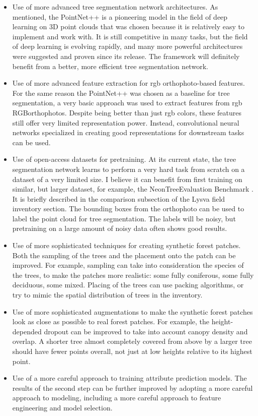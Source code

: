 \begin{itemize}
\item Use of more advanced tree segmentation network architectures.
  As mentioned, the PointNet++ is a pioneering model in the field of deep learning on 3D point clouds that was chosen because it is relatively easy to implement and work with.
  It is still competitive in many tasks, but the field of deep learning is evolving rapidly, and many more powerful architectures were suggested and proven since its release.
  The framework will definitely benefit from a better, more efficient tree segmentation network.
\item Use of more advanced feature extraction for \gls{rgb} orthophoto-based features.
  For the same reason the PointNet++ was chosen as a baseline for tree segmentation, a very basic approach was used to extract features from \gls{rgb} RGBorthophotos.
        Despite being better than just \gls{rgb} colors, these features still offer very limited representation power.
  Instead, convolutional neural networks specialized in creating good representations for downstream tasks can be used.
\item Use of open-access datasets for pretraining.
  At its current state, the tree segmentation network learns to perform a very hard task from scratch on a dataset of a very limited size.
  I believe it can benefit from first training on similar, but larger dataset, for example, the NeonTreeEvaluation Benchmark \citep{weinsteinDataNeonTreeEvaluationBenchmark2022}.
  It is briefly described in the comparison subsection of the Lysva field inventory section.
  The bounding boxes from the orthophoto can be used to label the point cloud for tree segmentation.
  The labels will be noisy, but pretraining on a large amount of noisy data often shows good results.
\item Use of more sophisticated techniques for creating synthetic forest patches.
  Both the sampling of the trees and the placement onto the patch can be improved.
  For example, sampling can take into consideration the species of the trees, to make the patches more realistic: some fully coniferous, some fully deciduous, some mixed.
  Placing of the trees can use packing algorithms, or try to mimic the spatial distribution of trees in the inventory.
\item Use of more sophisticated augmentations to make the synthetic forest patches look as close as possible to real forest patches.
  For example, the height-depended dropout can be improved to take into account canopy density and overlap.
  A shorter tree almost completely covered from above by a larger tree should have fewer points overall, not just at low heights relative to its highest point.
\item Use of a more careful approach to training attribute prediction models.
The results of the second step can be further improved by adopting a more careful approach to modeling, including a more careful approach to feature engineering and model selection.

\end{itemize}
